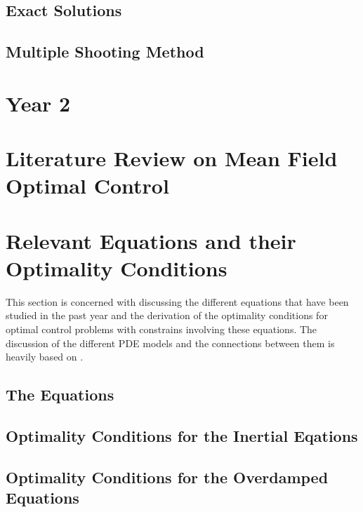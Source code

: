 \documentclass[11pt, a4paper]{article}
\theoremstyle{definition}
\begin{document}


\subsection{Exact Solutions} \label{secExactSolsDiffusion1}



\subsection{Multiple Shooting Method}	





	
\section*{Year 2}
	
\section{Literature Review on Mean Field Optimal Control}


\section{Relevant Equations and their Optimality Conditions}
This section is concerned with discussing the different equations that have been studied in the past year and the derivation of the optimality conditions for optimal control problems with constrains involving these equations. The discussion of the different PDE models and the connections between them is heavily based on \cite{Archer1}.

\subsection{The Equations}




\subsection{Optimality Conditions for the Inertial Eqations} \label{sec:INOptimalityConditions}



	
\subsection{Optimality Conditions for the Overdamped Equations}	
	
\end{document}
